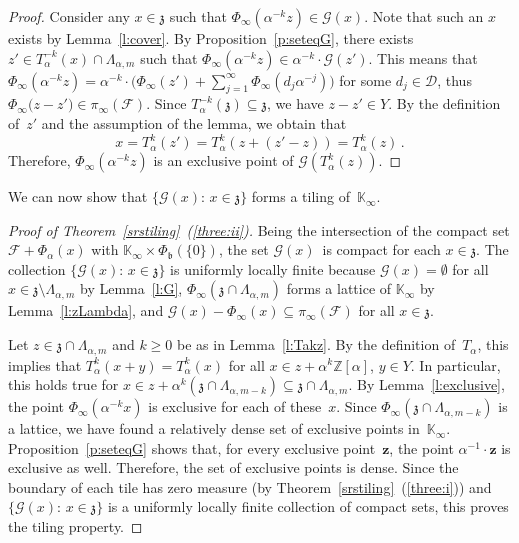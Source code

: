 \documentclass[12pt]{amsart}
\theoremstyle{definition}
\theoremstyle{remark}
\numberwithin{equation}{section}
\begin{document}
\begin{proof}
Consider any $x \in \mathfrak{z}$ such that $\Phi_\infty(\alpha^{-k} z) \in \mathcal{G}(x)$.
Note that such an $x$ exists by Lemma~\ref{l:cover}.
By Proposition~\ref{p:seteqG}, there exists $z' \in T_\alpha^{-k}(x) \cap \Lambda_{\alpha,m}$ such that $\Phi_\infty(\alpha^{-k} z) \in \alpha^{-k} \cdot \mathcal{G}(z')$.
This means that $\Phi_\infty(\alpha^{-k} z) = \alpha^{-k} \cdot \big(\Phi_\infty(z') + \sum_{j=1}^\infty \Phi_\infty(d_j \alpha^{-j})\big)$ for some $d_j \in \mathcal{D}$, thus $\Phi_\infty\big(z - z') \in \pi_\infty(\mathcal{F})$.
Since $T_\alpha^{-k}(\mathfrak{z}) \subseteq \mathfrak{z}$, we have $z - z' \in Y$.
By the definition of~$z'$ and the assumption of the lemma, we obtain that
\[
x = T_\alpha^k(z') = T_\alpha^k(z + (z'-z)) = T_\alpha^k(z)\,.
\]
Therefore, $\Phi_\infty(\alpha^{-k} z)$ is an exclusive point of $\mathcal{G}(T_\alpha^k(z))$.
\end{proof}

We can now show that $\{\mathcal{G}(x):\, x \in \mathfrak{z}\}$ forms a tiling of~$\mathbb{K}_\infty$.

\begin{proof}[Proof of Theorem~\ref{srstiling}~(\ref{three:ii})]
Being the intersection of the compact set $\mathcal{F} + \Phi_\alpha(x)$ with $\mathbb{K}_\infty \times \Phi_\mathfrak{b}(\{0\})$, the set $\mathcal{G}(x)$~is compact for each $x \in \mathfrak{z}$.
The collection $\{\mathcal{G}(x):\, x \in \mathfrak{z}\}$ is uniformly locally finite because $\mathcal{G}(x) = \emptyset$ for all $x \in \mathfrak{z} \setminus \Lambda_{\alpha,m}$ by Lemma~\ref{l:G}, $\Phi_\infty(\mathfrak{z} \cap \Lambda_{\alpha,m})$ forms a lattice of $\mathbb{K}_\infty$ by Lemma~\ref{l:zLambda}, and $\mathcal{G}(x) - \Phi_\infty(x) \subseteq \pi_\infty(\mathcal{F})$ for all $x \in \mathfrak{z}$.

Let $z \in \mathfrak{z} \cap \Lambda_{\alpha,m}$ and $k \ge 0$ be as in Lemma~\ref{l:Takz}.
By the definition of~$T_\alpha$, this implies that $T_\alpha^k(x + y) = T_\alpha^k(x)$ for all $x \in z + \alpha^k \mathbb{Z}[\alpha]$, $y \in Y$.
In particular, this holds true for $x \in z + \alpha^k (\mathfrak{z} \cap \Lambda_{\alpha,m-k}) \subseteq \mathfrak{z} \cap \Lambda_{\alpha,m}$.
By Lemma~\ref{l:exclusive}, the point $\Phi_\infty(\alpha^{-k} x)$ is exclusive for each of these~$x$.
Since $\Phi_\infty(\mathfrak{z} \cap \Lambda_{\alpha,m-k})$ is a lattice, we have found a relatively dense set of exclusive points in~$\mathbb{K}_\infty$.
Proposition~\ref{p:seteqG} shows that, for every exclusive point~$\mathbf{z}$, the point $\alpha^{-1} \cdot \mathbf{z}$ is exclusive as well.
Therefore, the set of exclusive points is dense.
Since the boundary of each tile has zero measure (by Theorem~\ref{srstiling}~(\ref{three:i})) and $\{\mathcal{G}(x):\, x \in \mathfrak{z}\}$ is a uniformly locally finite collection of compact sets, this proves the tiling property.
\end{proof}
\end{document}
